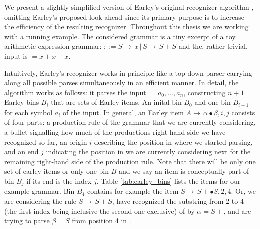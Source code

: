 %
\begin{isabellebody}%
%
%
\isadelimtheory
%
\endisadelimtheory
%
\isatagtheory
%
\endisatagtheory
{\isafoldtheory}%
%
\isadelimtheory
%
\endisadelimtheory
%
\isadelimdocument
%
\endisadelimdocument
%
\isatagdocument
%
\isamarkuptrue%
%
\endisatagdocument
{\isafolddocument}%
%
\isadelimdocument
%
\endisadelimdocument
%
\begin{isamarkuptext}%
We present a slightly simplified version of Earley's original recognizer algorithm \cite{Earley:1970},
omitting Earley's proposed look-ahead since its primary purpose is to increase the efficiency of the
resulting recognizer. Throughout this thesis we are working with a running example. The considered grammar is a tiny excerpt of a toy
arithmetic expression grammar: \isa{{\isasymG}} $::= S \rightarrow \, x \, \vert \, S \rightarrow \, S + S$ and
the, rather trivial, input is \isa{{\isasymomega}} $= x + x + x$.

Intuitively, Earley's recognizer works in principle like a top-down parser carrying along all possible
parses simultaneously in an efficient manner.
In detail, the algorithm works as follows: it parses the input \isa{{\isasymomega}} $=a_0,\dots,a_n$, constructing
$n+1$ Earley bins $B_i$ that are sets of Earley items. An inital bin $B_0$ and one bin $B_{i+1}$ for
each symbol $a_i$ of the input.
In general, an Earley item $A \rightarrow \, \alpha \bullet \beta, i, j$ consists of four parts: a production rule of the grammar that we are currently
considering, a bullet signalling how much of the productions right-hand side we have recognized so far,
an origin $i$ describing the position in \isa{{\isasymomega}} where we started parsing, and an end $j$ indicating
the position in \isa{{\isasymomega}} we are currently considering next for the remaining right-hand side of the production rule.
Note that there will be only one set of earley items or only one bin $B$ and we say an item is conceptually part of bin $B_j$ if its end is the index $j$.
Table \ref{tab:earley_bins} lists the items for our example grammar. Bin $B_4$ contains for example the item $S \rightarrow \, S + \bullet S, 2, 4$.
Or, we are considering the rule $S \rightarrow \, S + S$, have recognized the substring from $2$ to $4$ (the first index being
inclusive the second one exclusive) of \isa{{\isasymomega}} by $\alpha = S +$, and are trying to parse $\beta = S$ from position 4 in \omega. 


\end{isamarkuptext}
\end{isabellebody}
